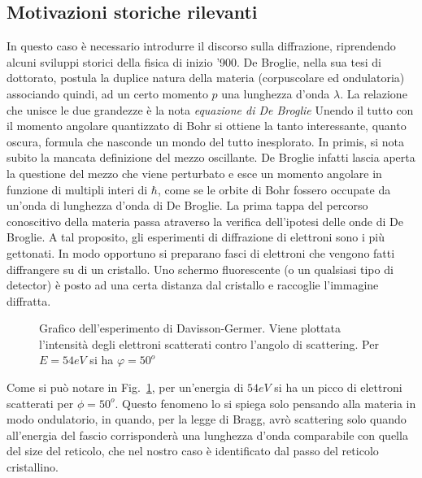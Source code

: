 \subsection{Motivazioni storiche rilevanti}
In questo caso è necessario introdurre il discorso sulla diffrazione, riprendendo alcuni sviluppi storici della fisica di inizio '900. De Broglie, nella sua tesi di dottorato, postula la duplice natura della materia (corpuscolare ed ondulatoria) associando quindi, ad un certo momento $p$ una lunghezza d'onda $\lambda$. La relazione che unisce le due grandezze è la nota \textit{equazione di De Broglie}
Unendo il tutto con il momento angolare quantizzato di Bohr si ottiene la tanto interessante, quanto oscura, formula
che nasconde un mondo del tutto inesplorato. In primis, si nota subito la mancata definizione del mezzo oscillante. De Broglie infatti lascia aperta la questione del mezzo che viene perturbato e esce un momento angolare in funzione di multipli interi di $\hbar$, come se le orbite di Bohr fossero occupate da un'onda di lunghezza d'onda di De Broglie. La prima tappa del percorso conoscitivo della materia passa atraverso la verifica dell'ipotesi delle onde di De Broglie. A tal proposito, gli esperimenti di diffrazione di elettroni sono i più gettonati. In modo opportuno si preparano fasci di elettroni che vengono fatti diffrangere su di un cristallo. Uno schermo fluorescente (o un qualsiasi tipo di detector) è posto ad una certa distanza dal cristallo e raccoglie l'immagine diffratta. 
\begin{figure}
	\centering
	\caption{Grafico dell'esperimento di Davisson-Germer. Viene plottata l'intensità degli elettroni scatterati contro l'angolo di scattering. Per $E=54eV$ si ha $\varphi=50^o$}
	\label{Davisson}
\end{figure}
Come si può notare in Fig.~\ref{Davisson}, per un'energia di $54eV$ si ha un picco di elettroni scatterati per $\phi=50^o$. Questo fenomeno lo si spiega solo pensando alla materia in modo ondulatorio, in quando, per la legge di Bragg, avrò scattering solo quando all'energia del fascio corrisponderà una lunghezza d'onda comparabile con quella del size del reticolo, che nel nostro caso è identificato dal passo del reticolo cristallino.
